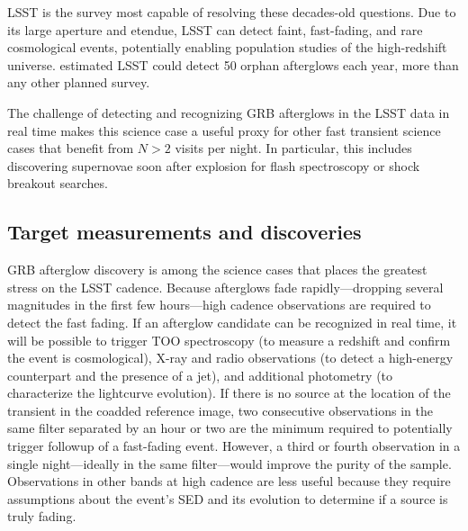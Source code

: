 LSST is the survey most capable of resolving these decades-old questions.  Due to its large aperture and etendue, LSST can detect faint, fast-fading, and rare cosmological events, potentially enabling population studies of the high-redshift universe.  
\citet{2015A&A...578A..71G} estimated LSST could detect 50 orphan afterglows each year, more than any other planned survey.




The challenge of detecting and recognizing GRB afterglows in the LSST data in 
real time makes this science case a useful proxy for other fast transient 
science cases that benefit from $N > 2$ visits per night.  In particular, this 
includes discovering supernovae soon after explosion for flash spectroscopy or 
shock breakout searches.



\subsection{Target measurements and discoveries}
\label{sec:\secname:targets}

GRB afterglow discovery is among the science cases that places the greatest stress on the LSST cadence.  Because afterglows fade rapidly---dropping several magnitudes in the first few hours---high cadence observations are required to detect the fast fading.  
If an afterglow candidate can be recognized in real time, it will be possible to trigger TOO spectroscopy (to measure a redshift and confirm the event is cosmological), X-ray and radio observations (to detect a high-energy counterpart and the presence of a jet), and additional photometry (to characterize the lightcurve evolution).  If there is no source at the location of the transient in the coadded reference image, two consecutive observations in the same filter separated by an hour or two are the minimum required to potentially trigger followup of a fast-fading event.  
However, a third or fourth observation in a single night---ideally in the same filter---would improve the purity of the sample.  Observations in other bands at high cadence are less useful because they require assumptions about the event's SED and its evolution to determine if a source is truly fading.

